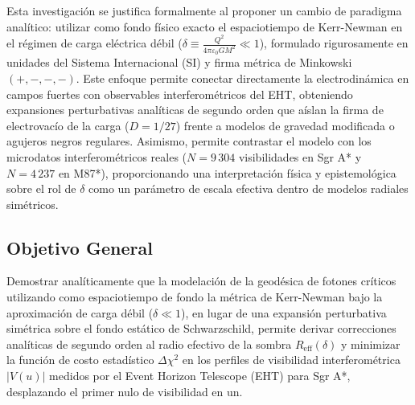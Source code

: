 Esta investigación se justifica formalmente al proponer un cambio de paradigma analítico: utilizar como fondo físico exacto el espaciotiempo de Kerr-Newman en el régimen de carga eléctrica débil ($\delta \equiv \frac{Q^2}{4\pi\varepsilon_0 G M^2} \ll 1$), formulado rigurosamente en unidades del Sistema Internacional (SI) y firma métrica de Minkowski $(+,-,-,-)$. Este enfoque permite conectar directamente la electrodinámica en campos fuertes con observables interferométricos del EHT, obteniendo expansiones perturbativas analíticas de segundo orden que aíslan la firma de electrovacío de la carga ($D = 1/27$) frente a modelos de gravedad modificada o agujeros negros regulares. Asimismo, permite contrastar el modelo con los microdatos interferométricos reales ($N = 9\,304$ visibilidades en Sgr A* y $N = 4\,237$ en M87*), proporcionando una interpretación física y epistemológica sobre el rol de $\delta$ como un parámetro de escala efectiva dentro de modelos radiales simétricos.

\subsection{Objetivo General}
Demostrar analíticamente que la modelación de la geodésica de fotones críticos utilizando como espaciotiempo de fondo la métrica de Kerr-Newman bajo la aproximación de carga débil ($\delta \ll 1$), en lugar de una expansión perturbativa simétrica sobre el fondo estático de Schwarzschild, permite derivar correcciones analíticas de segundo orden al radio efectivo de la sombra $R_{\mathrm{eff}}(\delta)$ y minimizar la función de costo estadístico $\Delta\chi^2$ en los perfiles de visibilidad interferométrica $|V(u)|$ medidos por el Event Horizon Telescope (EHT) para Sgr A*, desplazando el primer nulo de visibilidad en un.

